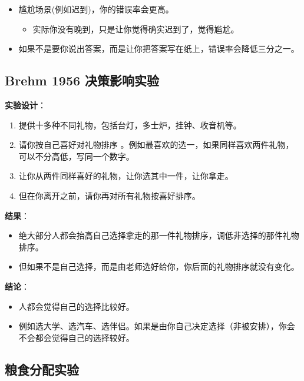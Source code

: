 \begin{itemize}
\tightlist
\item
  尴尬场景(例如迟到)，你的错误率会更高。

  \begin{itemize}
  \tightlist
  \item
    实际你没有晚到，只是让你觉得确实迟到了，觉得尴尬。
  \end{itemize}
\item
  如果不是要你说出答案，而是让你把答案写在纸上，错误率会降低三分之一。
\end{itemize}

\hypertarget{brehm-1956-ux51b3ux7b56ux5f71ux54cdux5b9eux9a8c}{%
\subsection{Brehm 1956
决策影响实验}\label{brehm-1956-ux51b3ux7b56ux5f71ux54cdux5b9eux9a8c}}

\textbf{实验设计}：

\begin{enumerate}
\tightlist
\item
  提供十多种不同礼物，包括台灯，多士炉，挂钟、收音机等。
\item
  请你按自己喜好对礼物排序
  。例如最喜欢的选一，如果同样喜欢两件礼物，可以不分高低，写同一个数字。
\item
  让你从两件同样喜好的礼物，让你选其中一件，让你拿走。
\item
  但在你离开之前，请你再对所有礼物按喜好排序。
\end{enumerate}

\textbf{结果}：

\begin{itemize}
\tightlist
\item
  绝大部分人都会抬高自己选择拿走的那一件礼物排序，调低非选择的那件礼物排序。
\item
  但如果不是自己选择，而是由老师选好给你，你后面的礼物排序就没有变化。
\end{itemize}

\textbf{结论}：

\begin{itemize}
\tightlist
\item
  人都会觉得自己的选择比较好。
\item
  例如选大学、选汽车、选伴侣。如果是由你自己决定选择（非被安排），你会不会都会觉得自己的选择较好。
\end{itemize}

\hypertarget{ux7caeux98dfux5206ux914dux5b9eux9a8c}{%
\subsection{粮食分配实验}\label{ux7caeux98dfux5206ux914dux5b9eux9a8c}}

